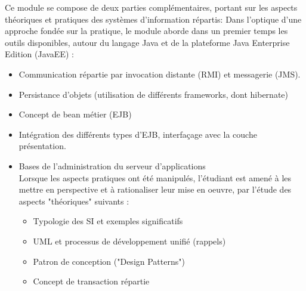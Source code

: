 

{
Ce module se compose de deux parties complémentaires, portant sur les
aspects théoriques et pratiques des systèmes d'information répartis:
Dans l'optique d'une approche fondée sur la pratique, le module aborde
dans un premier temps les outils disponibles, autour du langage Java et de
la plateforme Java Enterprise Edition (JavaEE) :
\begin{itemize} 
\item Communication répartie par invocation distante (RMI) et messagerie
(JMS).
\item Persistance d'objets (utilisation de différents frameworks, dont hibernate)
\item Concept de bean métier (EJB)
\item Intégration des différents types d'EJB, interfaçage avec la couche
présentation.
\item Bases de l'administration du serveur d'applications\\
Lorsque les aspects pratiques ont été manipulés, l'étudiant est amené à les
mettre en perspective et à rationaliser leur mise en oeuvre, par l'étude des
aspects "théoriques" suivants :
  \begin{itemize} 
  \item Typologie des SI et exemples significatifs
  \item UML et processus de développement unifié (rappels)
  \item Patron de conception ("Design Patterns")
  \item Concept de transaction répartie
  \end{itemize} 
\end{itemize} 
} 

